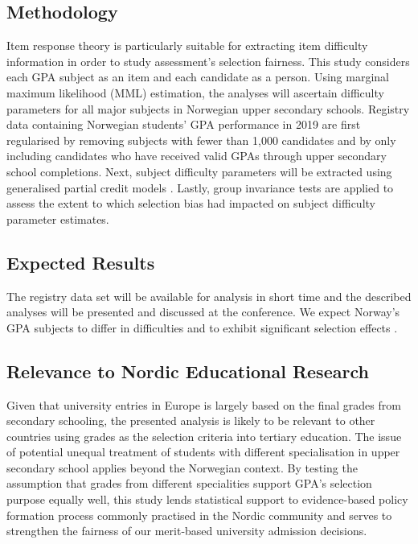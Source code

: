 \subsection{Methodology}

Item response theory is particularly suitable for extracting item difficulty information in order to study assessment's selection fairness. This study considers each GPA subject as an item and each candidate as a person. Using marginal maximum likelihood (MML) estimation, the analyses will ascertain difficulty parameters for all major subjects in Norwegian upper secondary schools. Registry data containing Norwegian students' GPA performance in 2019 are first regularised by removing subjects with fewer than 1,000 candidates and by only including candidates who have received valid GPAs through upper secondary school completions. Next, subject difficulty parameters will be extracted using generalised partial credit models \parencite[GPCM,][]{muraki:1992}. Lastly, group invariance tests are applied to assess the extent to which selection bias had impacted on subject difficulty parameter estimates.

\subsection{Expected Results}

The registry data set will be available for analysis in short time and the described analyses will be presented and discussed at the conference. We expect Norway's GPA subjects to differ in difficulties \parencite{he:2018} and to exhibit significant selection effects \parencite{korobko:2008}.

\subsection{Relevance to Nordic Educational Research}

Given that university entries in Europe is largely based on the final grades from secondary schooling, the presented analysis is likely to be relevant to other countries using grades as the selection criteria into tertiary education. The issue of potential unequal treatment of students with different specialisation in upper secondary school applies beyond the Norwegian context. By testing the assumption that grades from different specialities support GPA's selection purpose equally well, this study lends statistical support to evidence-based policy formation process commonly practised in the Nordic community and serves to strengthen the fairness of our merit-based university admission decisions.

\printbibliography
